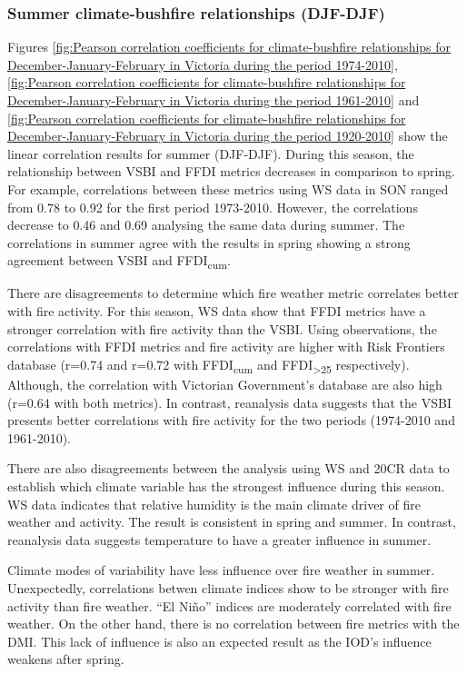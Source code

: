 \subsubsection{Summer climate-bushfire relationships (DJF-DJF)}

Figures \ref{fig:Pearson correlation coefficients for climate-bushfire relationships for December-January-February in Victoria during the period 1974-2010},
\ref{fig:Pearson correlation coefficients for climate-bushfire relationships for December-January-February in Victoria during the period 1961-2010}
and \ref{fig:Pearson correlation coefficients for climate-bushfire relationships for December-January-February in Victoria during the period 1920-2010}
show the linear correlation results for summer (DJF-DJF). During this
season, the relationship between VSBI and FFDI metrics decreases in
comparison to spring. For example, correlations between these metrics
using WS data in SON ranged from 0.78 to 0.92 for the first period
1973-2010. However, the correlations decrease to 0.46 and 0.69 analysing
the same data during summer. The correlations in summer agree with
the results in spring showing a strong agreement between VSBI and
FFDI\textsubscript{cum}.

There are disagreements to determine which fire weather metric correlates
better with fire activity. For this season, WS data show that FFDI
metrics have a stronger correlation with fire activity than the VSBI.
Using observations, the correlations with FFDI metrics and fire activity
are higher with Risk Frontiers database (r=0.74 and r=0.72 with FFDI\textsubscript{cum}
and FFDI\textsubscript{>25} respectively). Although, the correlation
with Victorian Government's database are also high (r=0.64 with both
metrics). In contrast, reanalysis data suggests that the VSBI presents
better correlations with fire activity for the two periods (1974-2010
and 1961-2010).

There are also disagreements between the analysis using WS and 20CR
data to establish which climate variable has the strongest influence
during this season. WS data indicates that relative humidity is the
main climate driver of fire weather and activity. The result is consistent
in spring and summer. In contrast, reanalysis data suggests temperature
to have a greater influence in summer.

Climate modes of variability have less influence over fire weather
in summer. Unexpectedly, correlations betwen climate indices show
to be stronger with fire activity than fire weather. \textquotedblleft El
Ni\~no\textquotedblright{} indices are moderately correlated with fire
weather. On the other hand, there is no correlation between fire metrics
with the DMI. This lack of influence is also an expected result as
the IOD's influence weakens after spring. 

